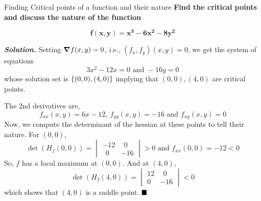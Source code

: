\documentclass[../Analysis-3.tex]{subfiles}
\begin{document}
\begin{Eg}{Finding Critical points of a function and their nature}{}
  \textbf{Find the critical points and discuss the nature of the function}

  $$\mathbf{f(x,y) = x^3 - 6x^2 - 8y^2}$$

  \textbf{\textit{Solution. }}  Setting $ \grad f(x,y) = 0 $, i.e., $ (f_x,f_y)(x,y) = 0 $, we get the system of equations
  \[ 3x^2 - 12x = 0 \text{  and  }  -16y = 0\]
  whose solution set is $ \qty{(0,0),(4,0)} $ implying that $(0,0), (4,0)$ are critical points.

  The 2nd derivatives are, \[ f_{xx}(x,y) = 6x - 12,\ f_{yy}(x,y) = -16 \text{ and } f_{xy}(x,y) = 0 \]
  Now, we compute the determinant of the hessian at these points to tell their nature. For $(0,0)$,
  \[ \det(H_f(0,0)) =  \begin{vmatrix}
      -12   & \ \ 0 \\
      \ \ 0 & -16
    \end{vmatrix} > 0 \text{  and  } f_{xx}(0,0) = -12 < 0\]
  So, $f$ has a local maximum at $(0,0)$. And at $(4,0)$,
  \[ \det(H_f(4,0)) =  \begin{vmatrix}
      12 & \ \ 0 \\
      0  & -16
    \end{vmatrix} < 0 \]
  which shows that $(4,0)$ is a saddle point. $\hfill \blacksquare$
\end{Eg}
\end{document}
